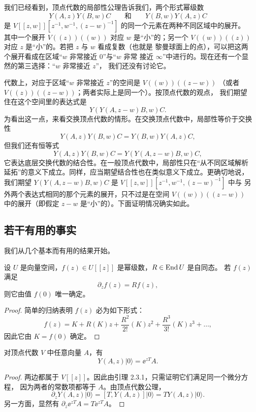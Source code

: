 我们已经看到，顶点代数的局部性公理告诉我们，两个形式幂级数
\[
    Y(A,z)Y(B,w)C
    \qquad\text{和}\qquad
    Y(B,w)Y(A,z)C
\]
是 $V[[z,w]][z^{-1},w^{-1},(z-w)^{-1}]$ 的同一个元素在两种不同区域中的展开。
其中一个展开 $V(\!(z)\!)(\!(w)\!)$ 对应 $w$ 是“小”的；另一个
$V(\!(w)\!)(\!(z)\!)$ 对应 $z$ 是“小”的。若把 $z$ 与 $w$ 看成复数（也就是
黎曼球面上的点），可以把这两个展开看成在区域“$w$ 非常接近 $0$”与“$w$ 非常
接近 $\infty$”中进行的。现在还有一个显然的第三选择：“$w$ 非常接近 $z$”，
我们还没有讨论它。

代数上，对应于区域“$w$ 非常接近 $z$”的空间是 $V(\!(w)\!)(\!(z-w)\!)$
（或者 $V(\!(z)\!)(\!(z-w)\!)$；两者实际上是同一个）。按顶点代数的观点，
我们期望住在这个空间里的表达式是
\[
    Y(Y(A,z-w)B,w)C.
\]
为看出这一点，来看交换顶点代数的情形。在交换顶点代数中，局部性等价于交换性
\[
    Y(A,z)Y(B,w)C=Y(B,w)Y(A,z)C,
\]
但我们还有恒等式
\[
    Y(A,z)Y(B,w)C=Y(Y(A,z-w)B,w)C,
\]
它表达底层交换代数的结合性。在一般顶点代数中，局部性只在“从不同区域解析
延拓”的意义下成立。同样，应当期望结合性也在类似意义下成立。更确切地说，
我们期望 $Y(Y(A,z-w)B,w)C$ 是 $V[[z,w]][z^{-1},w^{-1},(z-w)^{-1}]$ 中与
另外两个表达式相同的那个元素的展开，只不过是在空间 $V(\!(w)\!)(\!(z-w)\!)$
中的展开（即假定 $z-w$ 是“小”的）。下面证明情况确实如此。

\subsection{若干有用的事实}

我们从几个基本而有用的结果开始。

\renewcommand{\thelemma}{2.3.1}
\begin{lemma}
    设 $U$ 是向量空间，$f(z)\in U[[z]]$ 是幂级数，$R\in\operatorname{End} U$ 是自同态。
    若 $f(z)$ 满足
    \[
        \partial_zf(z)=Rf(z),
    \]
    则它由值 $f(0)$ 唯一确定。
\end{lemma}

\begin{proof}
    简单的归纳表明 $f(z)$ 必为如下形式：
    \[
        f(z)=K+R(K)z+\frac{R^2}{2!}(K)z^2+\frac{R^3}{3!}(K)z^3+\dots,
    \]
    因此它由 $K=f(0)$ 确定。
\end{proof}

\renewcommand{\thecorollary}{2.3.1}
\begin{corollary}
    对顶点代数 $V$ 中任意向量 $A$，有
    \[
        Y(A,z)|0\rangle=\ee^{zT}A.
    \]
\end{corollary}

\begin{proof}
    两边都属于 $V[[z]]$。因此由引理 2.3.1，只需证明它们满足同一个微分方程，
    因为两者的常数项都等于 $A$。由顶点代数公理，
    \[
        \partial_zY(A,z)|0\rangle=[T,Y(A,z)]|0\rangle=TY(A,z)|0\rangle.
    \]
    另一方面，显然有 $\partial_z\ee^{zT}A=T\ee^{zT}A$。
\end{proof}


